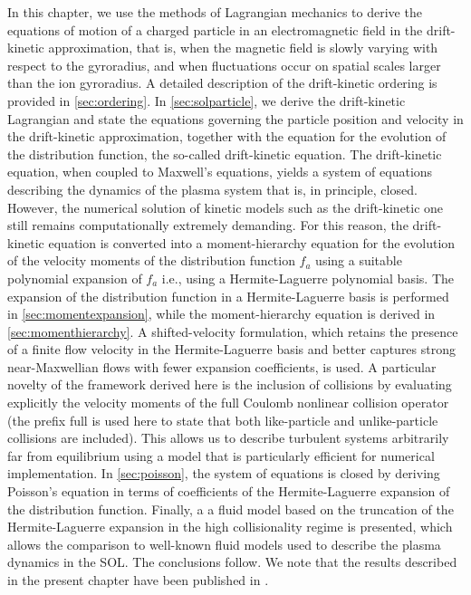 In this chapter, we use the methods of Lagrangian mechanics to derive the equations of motion of a charged particle in an electromagnetic field in the drift-kinetic approximation, that is, when the magnetic field is slowly varying with respect to the gyroradius, and when fluctuations occur on spatial scales larger than the ion gyroradius.
%
A detailed description of the drift-kinetic ordering is provided in \cref{sec:ordering}.
%
In \cref{sec:solparticle}, we derive the drift-kinetic Lagrangian and state the equations governing the particle position and velocity in the drift-kinetic approximation, together with the equation for the evolution of the distribution function, the so-called drift-kinetic equation.
%
The drift-kinetic equation, when coupled to Maxwell's equations, yields a system of equations describing the dynamics of the plasma system that is, in principle, closed.
%
However, the numerical solution of kinetic models such as the drift-kinetic one still remains computationally extremely demanding.
%
For this reason, the drift-kinetic equation is converted into a moment-hierarchy equation for the evolution of the velocity moments of the distribution function $f_a$ using a suitable polynomial expansion of $f_a$ i.e., using a Hermite-Laguerre polynomial basis.
%
The expansion of the distribution function in a Hermite-Laguerre basis is performed in \cref{sec:momentexpansion}, while the moment-hierarchy equation is derived in \cref{sec:momenthierarchy}.
%
A shifted-velocity formulation, which retains the presence of a finite flow velocity in the Hermite-Laguerre basis and better captures strong near-Maxwellian flows with fewer expansion coefficients, is used.
%
A particular novelty of the framework derived here is the inclusion of collisions by evaluating explicitly the velocity moments of the full Coulomb nonlinear collision operator (the prefix full is used here to state that both like-particle and unlike-particle collisions are included).
%
This allows us to describe turbulent systems arbitrarily far from equilibrium using a model that is particularly efficient for numerical implementation.
%
In \cref{sec:poisson}, the system of equations is closed by deriving Poisson's equation in terms of coefficients of the Hermite-Laguerre expansion of the distribution function.
%
Finally, a a fluid model based on the truncation of the Hermite-Laguerre expansion in the high collisionality regime is presented, which allows the comparison to well-known fluid models used to describe the plasma dynamics in the SOL.
%
The conclusions follow.
%
We note that the results described in the present chapter have been published in \citet{Jorge2017}.

